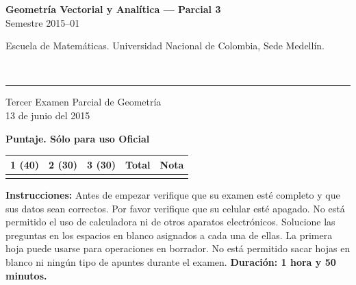 \documentclass[11pt]{article}
\newcommand{\examheader}{%
  \noindent
  \begin{minipage}[t]{0.6\linewidth}
    {\small\bfseries Geometría Vectorial y Analítica --- Parcial 3}\\
    {\small Semestre 2015--01}
  \end{minipage}%
  \hfill
  \begin{minipage}[t]{0.35\linewidth}
    \raggedleft\small Escuela de Matemáticas. Universidad Nacional de Colombia, Sede Medellín.
  \end{minipage}\\[2pt]
  \rule{\linewidth}{0.6pt}
}
\begin{document}
\examheader

\begin{center}
{\large Tercer Examen Parcial de Geometría}\\[4pt]
{\small 13 de junio del 2015}
\end{center}

\vspace{6pt}
\textbf{Puntaje. Sólo para uso Oficial}

\begin{center}
\begin{tabular}{|c|c|c|c|c|}
\hline
1 (40) & 2 (30) & 3 (30) & Total & Nota \\
\hline
 & & & & \\
\hline
\end{tabular}
\end{center}

\vspace{10pt}
\textbf{Instrucciones:} Antes de empezar verifique que su examen esté completo y que sus datos sean correctos. Por favor verifique que su celular esté apagado. No está permitido el uso de calculadora ni de otros aparatos electrónicos. Solucione las preguntas en los espacios en blanco asignados a cada una de ellas. La primera hoja puede usarse para operaciones en borrador. No está permitido sacar hojas en blanco ni ningún tipo de apuntes durante el examen. \textbf{Duración: 1 hora y 50 minutos.}
\end{document}
